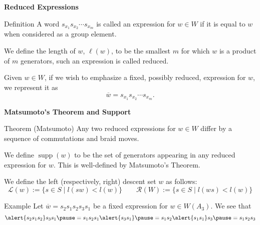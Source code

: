 \documentclass[9pt,handout]{beamer}
\newcommand{\w}{\overline{w}}
\DeclareMathOperator{\supp}{supp}
\newcommand{\RD}{\mathcal{R}}
\begin{document}
\begin{frame}{\textbf{Reduced Expressions}}

\begin{block}{Definition}
A word $s_{x_1}s_{x_2}\cdots s_{x_m}$ is called an \alert
{expression} for $w\in W$ if it is equal to $w$ when considered as 
a group element.

\vspace{1em}
\pause

We define the \alert{length} of $w$, $\ell(w)$, to be the smallest $m$ for which $w$ is a product of $m$ generators, such an expression is called \alert{reduced}.

\vspace{1em}
\pause

Given $w \in W$, if we wish to emphasize a fixed, possibly reduced, 
expression for $w$, we represent it as
\[
\w=s_{x_1}s_{x_2}\cdots s_{x_m}.
\]
\end{block}

\end{frame}


\begin{frame}{\textbf{Matsumoto's Theorem and Support}}
\begin{block}{Theorem (Matsumoto)}
Any two reduced expressions for $w\in W$ differ by a sequence of commutations and braid moves.
\end{block}	

\pause

\begin{definition}
	We define $\supp(w)$ to be the set of generators appearing in any reduced expression for $w$. This is well-defined by Matsumoto's Theorem.
\end{definition}

\pause

\begin{definition}
 We define the \alert{left} (respectively, \alert{right}) \alert{descent set}  $w$ as follows:
\[\mathcal{L}(w):=\{s \in S \mid l(sw) < l(w)\} \qquad \RD(W):=\{s \in S \mid l(ws)< l(w)\}\]
\end{definition}

\pause

\begin{block}{Example}
Let $\w=s_2s_1s_2s_3s_1$ be a fixed expression for $w \in W(A_3)$. We see that
\[\alert{s_2s_1s_2}s_3s_1 \pause =s_1s_2s_1\alert{s_3s_1} \pause =s_1s_2\alert{s_1s_1}s_3\pause=s_1s_2s_3\]	
\end{block}

\end{frame}
\end{document}

